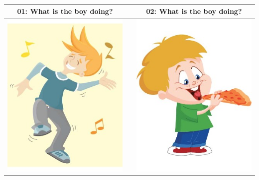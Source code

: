 \documentclass[12pt,notitlepage]{article}
\date{}
\begin{document}

\begin{center}
\begin{tabular}{|c|c|c|}
\hline
01: What is the boy doing? && 02: What is the boy doing? \\
\hline
\includegraphics[width=20em,trim=0 0 0 -3]{figures/I01.jpg} & & \includegraphics[width=20em,trim=0 0 0 -3]{figures/I02.jpg} \\
\hline
\end{tabular}
\vspace{1em} \\



\end{center}
\end{document}
